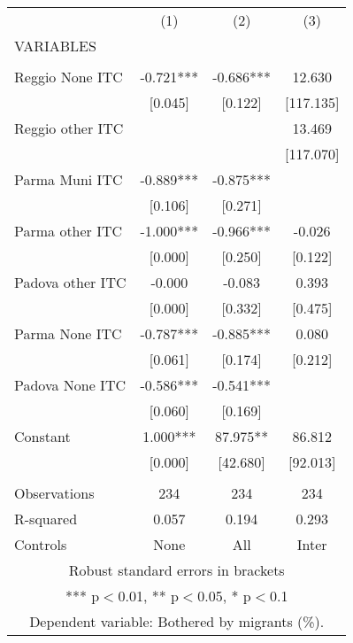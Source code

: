 \begin{tabular}{lccc} \hline
 & (1) & (2) & (3) \\
VARIABLES &  &  &  \\ \hline
 &  &  &  \\
Reggio None ITC & -0.721*** & -0.686*** & 12.630 \\
 & [0.045] & [0.122] & [117.135] \\
Reggio other ITC &  &  & 13.469 \\
 &  &  & [117.070] \\
Parma Muni ITC & -0.889*** & -0.875*** &  \\
 & [0.106] & [0.271] &  \\
Parma other ITC & -1.000*** & -0.966*** & -0.026 \\
 & [0.000] & [0.250] & [0.122] \\
Padova other ITC & -0.000 & -0.083 & 0.393 \\
 & [0.000] & [0.332] & [0.475] \\
Parma None ITC & -0.787*** & -0.885*** & 0.080 \\
 & [0.061] & [0.174] & [0.212] \\
Padova None ITC & -0.586*** & -0.541*** &  \\
 & [0.060] & [0.169] &  \\
Constant & 1.000*** & 87.975** & 86.812 \\
 & [0.000] & [42.680] & [92.013] \\
 &  &  &  \\
Observations & 234 & 234 & 234 \\
R-squared & 0.057 & 0.194 & 0.293 \\
 Controls & None & All & Inter \\ \hline
\multicolumn{4}{c}{ Robust standard errors in brackets} \\
\multicolumn{4}{c}{ *** p$<$0.01, ** p$<$0.05, * p$<$0.1} \\
\multicolumn{4}{c}{ Dependent variable: Bothered by migrants (\%).} \\
\end{tabular}
